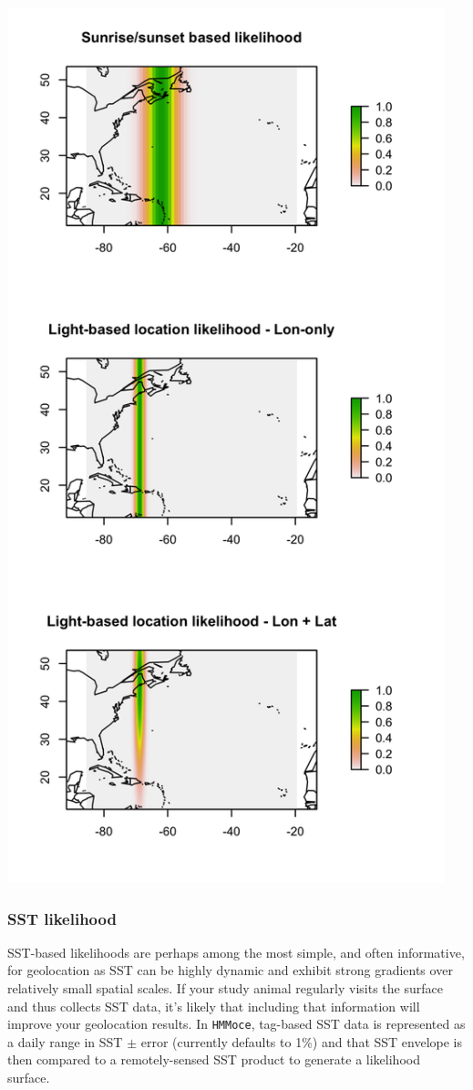 \documentclass{article}\usepackage[]{graphicx}\usepackage[]{color}
\begin{document}
\includegraphics[width=5in, keepaspectratio]{./example_light_lik.png}

\subsubsection{SST likelihood}

SST-based likelihoods are perhaps among the most simple, and often informative, for geolocation as SST can be highly dynamic and exhibit strong gradients over relatively small spatial scales. If your study animal regularly visits the surface and thus collects SST data, it's likely that including that information will improve your geolocation results. In \texttt{HMMoce}, tag-based SST data is represented as a daily range in SST $\pm$ error (currently defaults to 1\%) and that SST envelope is then compared to a remotely-sensed SST product to generate a likelihood surface.
\end{document}
